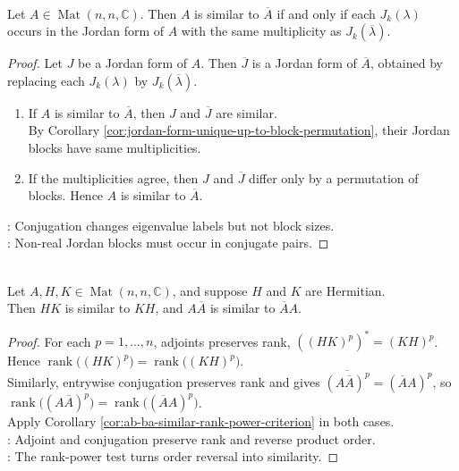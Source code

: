 \begin{theorem} \label{thm:conjugate-similarity-jordan-block-criterion} \\
Let $A\in\operatorname{Mat}(n,n,\mathbb{C})$. Then $A$ is similar to $\overline{A}$ if and only if each $J_k(\lambda)$ occurs in the Jordan form of $A$ with the same multiplicity as $J_k(\overline{\lambda})$.
\begin{proof}
Let $J$ be a Jordan form of $A$. Then $\overline{J}$ is a Jordan form of $\overline{A}$, obtained by replacing each $J_k(\lambda)$ by $J_k(\overline{\lambda})$.
\begin{enumerate}[label=\roman*.]
\setlength{\itemsep}{0pt}
\item[$(\Rightarrow)$] If $A$ is similar to $\overline{A}$, then $J$ and $\overline{J}$ are similar.\\
By Corollary \ref{cor:jordan-form-unique-up-to-block-permutation}, their Jordan blocks have same multiplicities.
\item[$(\Leftarrow)$] If the multiplicities agree, then $J$ and $\overline{J}$ differ only by a permutation of blocks. Hence $A$ is similar to $\overline{A}$.
\end{enumerate}
: Conjugation changes eigenvalue labels but not block sizes.\\
: Non-real Jordan blocks must occur in conjugate pairs.
\end{proof}
\end{theorem}

\begin{corollary} \label{cor:hermitian-products-and-conjugate-products} \\
Let $A,H,K\in\operatorname{Mat}(n,n,\mathbb{C})$, and suppose $H$ and $K$ are Hermitian.\\
Then $HK$ is similar to $KH$, and $A\overline{A}$ is similar to $\overline{A}A$.
\begin{proof}
For each $p=1,\ldots,n$, adjoints preserves rank, $((HK)^p)^*=(KH)^p$. Hence $\operatorname{rank}\bigl((HK)^p\bigr)=\operatorname{rank}\bigl((KH)^p\bigr)$.\\
Similarly, entrywise conjugation preserves rank and gives $\overline{(A\overline{A})^p}=(\overline{A}A)^p$, so $\operatorname{rank}\bigl((A\overline{A})^p\bigr)=\operatorname{rank}\bigl((\overline{A}A)^p\bigr)$.\\
Apply Corollary \ref{cor:ab-ba-similar-rank-power-criterion} in both cases.\\
: Adjoint and conjugation preserve rank and reverse product order.\\
: The rank-power test turns order reversal into similarity.
\end{proof}
\end{corollary}


